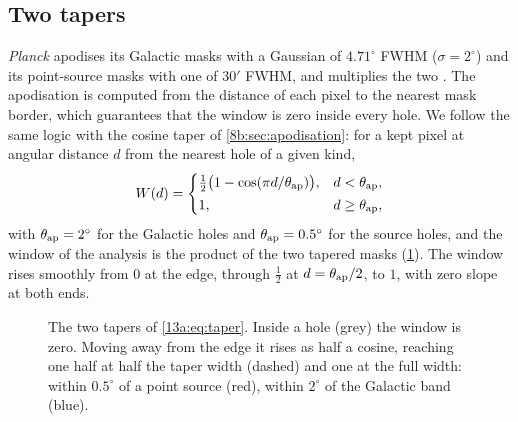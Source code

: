 \subsection{Two tapers}
\label{13a:sec:taper}

\textit{Planck} apodises its Galactic masks with a Gaussian of $4.71^\circ$ FWHM ($\sigma=2^\circ$) and its
point-source masks with one of $30'$ FWHM, and multiplies the two \cite[§3.2.2]{Planck2018V}. The
apodisation is computed from the distance of each pixel to the nearest mask border, which guarantees that the
window is zero inside every hole. We follow the same logic with the cosine taper of
\cref{8b:sec:apodisation}: for a kept pixel at angular distance $d$ from the nearest hole of a given kind,
\begin{equation}
  W(d)=\begin{cases}\tfrac12\bigl(1-\cos(\pi d/\theta_{\rm ap})\bigr), & d<\theta_{\rm ap},\\[2pt] 1, & d\ge\theta_{\rm ap},\end{cases}
  \label{13a:eq:taper}
\end{equation}
with $\theta_{\rm ap}=2^\circ$ for the Galactic holes and $\theta_{\rm ap}=0.5^\circ$ for the source holes, and the
window of the analysis is the product of the two tapered masks (\cref{13a:fig:taper}). The window rises
smoothly from $0$ at the edge, through $\tfrac12$ at $d=\theta_{\rm ap}/2$, to $1$, with zero slope at both ends.

\begin{figure}[htbp]
\centering
{}
\caption{The two tapers of \eqref{13a:eq:taper}. Inside a hole (grey) the window is zero. Moving away from the
edge it rises as half a cosine, reaching one half at half the taper width (dashed) and one at the full
width: within $0.5^\circ$ of a point source (red), within $2^\circ$ of the Galactic band (blue).}
\label{13a:fig:taper}
\end{figure}

